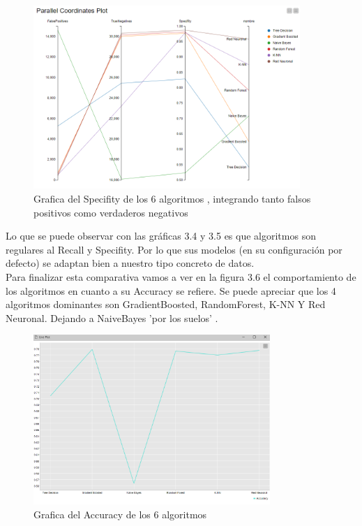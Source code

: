 	\begin{figure}[htb]
		\centering
		\includegraphics[width=0.9\textwidth]{./imagenes/38}
		\caption{Grafica del Specifity de los 6 algoritmos , integrando tanto falsos positivos como verdaderos negativos} \label{fig:1}
	\end{figure}

	Lo que se puede observar con las gráficas 3.4 y 3.5 es que algoritmos son regulares al Recall y Specifity. Por lo que sus modelos (en su configuración por defecto) 
	se adaptan bien a nuestro tipo concreto de datos. \\

	Para finalizar esta comparativa vamos a ver en la figura 3.6 el comportamiento de los algoritmos en cuanto a su Accuracy se refiere. Se puede apreciar que los 4 algoritmos dominantes
	son GradientBoosted, RandomForest, K-NN Y Red Neuronal. Dejando a NaiveBayes 'por los suelos' .

	\begin{figure}[htb]
		\centering
		\includegraphics[width=0.8\textwidth]{./imagenes/39}
		\caption{Grafica del Accuracy de los 6 algoritmos} \label{fig:1}
	\end{figure}

